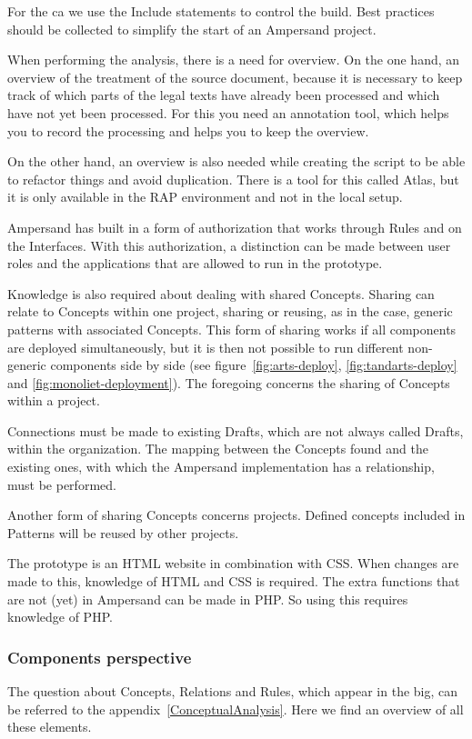 For the \acrlong{ca} we use the Include statements to control the build.
Best practices should be collected to simplify the start of an Ampersand project.

When performing the analysis, there is a need for overview.
On the one hand, an overview of the treatment of the source document, because it is necessary to keep track of which parts of the legal texts have already been processed and which have not yet been processed.
For this you need an annotation tool, which helps you to record the processing and helps you to keep the overview.

On the other hand, an overview is also needed while creating the script to be able to refactor things and avoid duplication.
There is a tool for this called Atlas, but it is only available in the RAP environment and not in the local setup.

Ampersand has built in a form of authorization that works through Rules and on the Interfaces.
With this authorization, a distinction can be made between user roles and the applications that are allowed to run in the prototype.

Knowledge is also required about dealing with shared Concepts.
Sharing can relate to Concepts within one project, sharing or reusing, as in the case, generic patterns with associated Concepts.
This form of sharing works if all components are deployed simultaneously, but it is then not possible to run different non-generic components side by side (see figure~\ref{fig:arts-deploy}, \ref{fig:tandarts-deploy} and \ref{fig:monoliet-deployment}).
The foregoing concerns the sharing of Concepts within a project.

Connections must be made to existing Drafts, which are not always called Drafts, within the organization.
The mapping between the Concepts found and the existing ones, with which the Ampersand implementation has a relationship, must be performed.

Another form of sharing Concepts concerns projects.
Defined concepts included in Patterns will be reused by other projects.

The prototype is an HTML website in combination with CSS.
When changes are made to this, knowledge of HTML and CSS is required.
The extra functions that are not (yet) in Ampersand can be made in PHP.
So using this requires knowledge of PHP.

\subsubsection{Components perspective}\label{subsub:components_perspective}
The question about Concepts, Relations and Rules, which appear in the \acrshort{big}, can be referred to the appendix~\ref{ConceptualAnalysis}.
Here we find an overview of all these elements.

